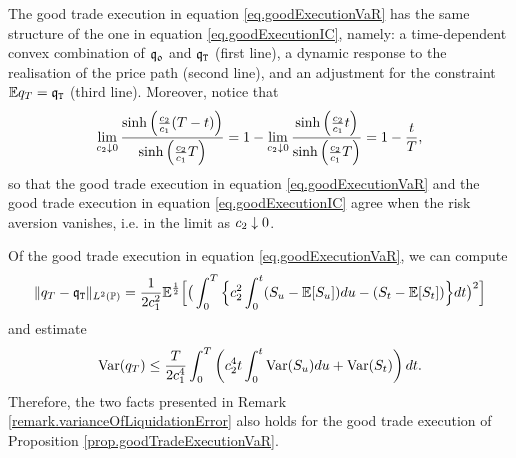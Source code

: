 \documentclass[10pt,a4paper]{article}
\begin{document}
\begin{remark}
	The good trade execution in equation \eqref{eq.goodExecutionVaR} has the same structure of the one in equation \eqref{eq.goodExecutionIC}, namely: a time-dependent convex combination of $\mathfrak{q_0}$ and $\mathfrak{q}_{\mathtt{T} }$ (first line), a dynamic response to the realisation of the price path (second line), and an adjustment for the constraint $\mathbb{{E}}q_T = \mathfrak{q}_{\mathtt{T} }$ (third line). Moreover, notice that 
	\begin{equation*}
	\lim_{c_{2}\downarrow 0}
	\frac{\sinh\left(\frac{c_{2}}{c_{1}} (T - t)\right)}{\sinh\left(\frac{c_{2}}{c_{1}} T \right)}
	= 1 - 	\lim_{c_{2}\downarrow 0}
	\frac{\sinh\left(\frac{c_{2}}{c_{1}}  t\right)}{\sinh\left(\frac{c_{2}}{c_{1}} T \right)}
	= 1- \frac{t}{T},
	\end{equation*} 
	so that the good trade execution in equation \eqref{eq.goodExecutionVaR} and the good trade execution in equation \eqref{eq.goodExecutionIC} agree when the risk aversion vanishes, i.e. in the limit as $c_{2}\downarrow 0$. 
\end{remark}

\begin{remark}
	Of the good trade execution in equation \eqref{eq.goodExecutionVaR}, we can compute 
	\begin{equation*}
	\lVert q_T - \mathfrak{q}_{\mathtt{T} } \rVert_{L^{2}({\mathbb{P}})}
	= \frac{1}{2c_{1}^{2}} 
	\mathbb{{E}}^{\frac{1}{2}} \Big[
	\big(
	\int_{0}^{T}
		\Big\lbrace
			c_{2}^{2} \int_{0}^{t} (S_u - \mathbb{{E}}[S_u])du 
			-  (S_t - \mathbb{{E}}[S_t])
		\Big\rbrace dt 
	\big)^{2} 
	\Big]
	\end{equation*}
	and estimate 
	\begin{equation*}
	\mathrm{Var}(q_T) \leq 
	\frac{T}{2c_{1}^{4}} \int_{0}^{T}
	\left(
	c_{2}^{4} t \int_{0}^{t} \mathrm{Var}(S_u)du + \mathrm{Var}(S_t)
	\right)dt.
	\end{equation*}
	Therefore, the two facts presented in Remark \ref{remark.varianceOfLiquidationError} also holds for the good trade execution of Proposition \ref{prop.goodTradeExecutionVaR}.
\end{remark}
\end{document}
